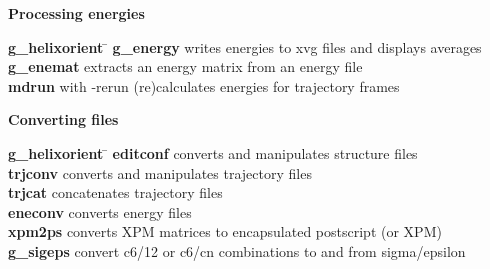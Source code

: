 \begin{description}
\item {\large\bf Processing energies}
\vspace{-2ex}\begin{tabbing}
{\bf g\_helixorient} \= \kill
{\bf g\_energy} \> writes energies to xvg files and displays averages \\
{\bf g\_enemat} \> extracts an energy matrix from an energy file \\
{\bf mdrun} \> with -rerun (re)calculates energies for trajectory frames \\
\end{tabbing}\vspace{-2ex}

\item {\large\bf Converting files}
\vspace{-2ex}\begin{tabbing}
{\bf g\_helixorient} \= \kill
{\bf editconf} \> converts and manipulates structure files \\
{\bf trjconv} \> converts and manipulates trajectory files \\
{\bf trjcat} \> concatenates trajectory files \\
{\bf eneconv} \> converts energy files \\
{\bf xpm2ps} \> converts XPM matrices to encapsulated postscript (or XPM) \\
{\bf g\_sigeps} \> convert c6/12 or c6/cn combinations to and from sigma/epsilon \\
\end{tabbing}\vspace{-2ex}


\end{description}
